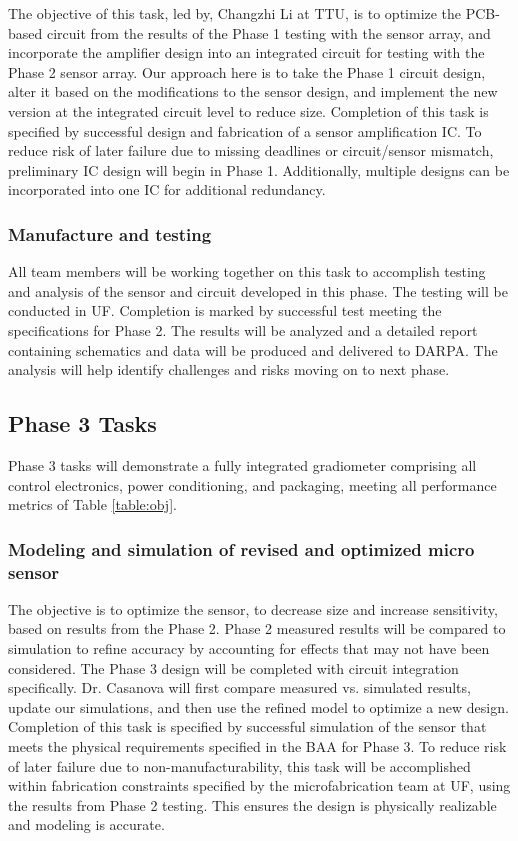 The objective of this task, led by, Changzhi Li at TTU, is to optimize the PCB-based circuit from the results of the Phase 1 testing with the sensor array, and incorporate the amplifier design into an integrated circuit for testing with the Phase 2 sensor array. Our approach here is to take the Phase 1 circuit design, alter it based on the modifications to the sensor design, and implement the new version at the integrated circuit level to reduce size. Completion of this task is specified by successful design and fabrication of a sensor amplification IC. To reduce risk of later failure due to missing deadlines or circuit/sensor mismatch, preliminary IC design will begin in Phase 1. Additionally, multiple designs can be incorporated into one IC for additional redundancy.


\subsubsection{Manufacture and testing}\label{sec:p2:test}

All team members will be working together on this task to accomplish testing and analysis of the sensor and circuit developed in this phase. The testing will be conducted in UF. Completion is marked by successful test meeting the specifications for Phase 2. The results will be analyzed and a detailed report containing schematics and data will be produced and delivered to DARPA. The analysis will help identify challenges and risks moving on to next phase.

\subsection{Phase 3 Tasks}
Phase 3 tasks will demonstrate a fully integrated gradiometer comprising all control
electronics, power conditioning, and packaging, meeting all performance metrics of Table  \ref{table:obj}.

\subsubsection{Modeling and simulation of revised and optimized micro sensor}\label{sec:p3:em}

The objective is to optimize the sensor, to decrease size and increase sensitivity, based on results from the Phase 2. Phase 2 measured results will be compared to simulation to refine accuracy by accounting for effects that may not have been considered. The Phase 3 design will be completed with circuit integration specifically. Dr. Casanova will first compare measured vs. simulated results, update our simulations, and then use the refined model to optimize a new design. Completion of this task is specified by successful simulation of the sensor that meets the physical requirements specified in the BAA for Phase 3. To reduce risk of later failure due to non-manufacturability, this task will be accomplished within fabrication constraints specified by the microfabrication team at UF, using the results from Phase 2 testing. This ensures the design is physically realizable and modeling is accurate.

